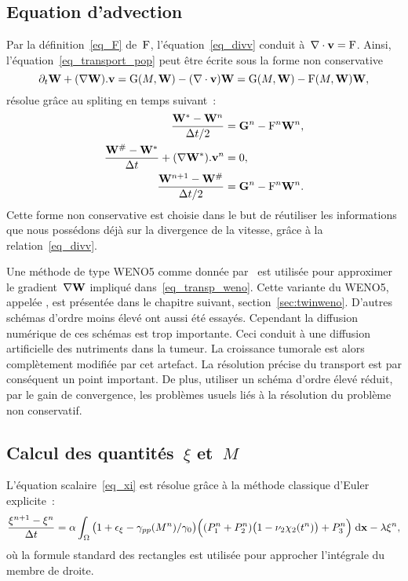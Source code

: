 \documentclass[main.tex]{subfiles}
\begin{document}
\subsection{Equation d'advection}
Par la définition~\eqref{eq_F} de~${\rm F}$, l'équation~\eqref{eq_divv} 
conduit à~$\nabla\cdot\mathbf{v}={\rm F}$. 
Ainsi, l'équation~\eqref{eq_transport_pop} peut être écrite sous la forme non conservative
\begin{equation}\label{eq_non_conservative}
\partial_t {\bf W} + (\nabla {\bf W}).\mathbf{v} = {\rm G}(M,{\bf W})-(\nabla\cdot \mathbf{v}){\bf W} = {\rm G}(M,{\bf W})-{\rm F}(M,{\bf W}){\bf W},
\end{equation}
résolue grâce au spliting en temps suivant~:
\begin{align}
 \dfrac{\W^*-\W^n}{\Delta t / 2}  &= \GG^n-\Frm^n\W^n, %
 \label{eq_snd_membre} \\
\dfrac{\W^\#-\W^*}{\Delta t} + (\nabla \W^*).\vit^n&= 0,%
 \label{eq_transp_weno}\\
 \dfrac{\W^{n+1}-\W^\#}{\Delta t / 2}  &= \GG^n-\Frm^n\W^n. \label{eq_snd_membre2} 
\end{align}
Cette forme non conservative est choisie dans le but de réutiliser les informations que nous possédons déjà sur la divergence de la vitesse, grâce à la relation~\eqref{eq_divv}.


Une méthode de type WENO5 comme donnée par~\cite{Liu1994} est utilisée pour approximer le gradient~$\nabla {\bf W}$ impliqué  dans~\eqref{eq_transp_weno}. Cette variante du WENO5, appelée \twinweno, est présentée dans le chapitre suivant, section~\ref{sec:twinweno}. 
D'autres schémas d'ordre moins élevé ont aussi été essayés. Cependant la diffusion numérique de ces schémas est trop importante. Ceci conduit à une diffusion artificielle des nutriments dans la tumeur. La croissance tumorale est alors complètement modifiée par cet artefact. La résolution précise du transport est par conséquent un point important. De plus,  utiliser un schéma d'ordre élevé réduit, par le gain de convergence, les problèmes usuels liés à la résolution du problème non conservatif.

\subsection{Calcul des quantités~$\xi$ et~$M$}
L'équation scalaire~\eqref{eq_xi} est résolue grâce à la méthode classique d'Euler explicite~:
\begin{equation}\label{eq:xi_disc}
\dfrac{\xi^{n+1}-\xi^n}{\Delta t} = \alpha \int_\Omega \big(1+\epsilon_{\xi} - \gamma_{pp}(M^n) / \gamma_0 \big)\Big((P_1^n +P_2^n) \big(1-\nu_2 \chi_2(t^n) \big)+P_3^n \Big) \textrm{\;d}\mathbf{x} - \lambda \xi^n,
\end{equation} 
où la formule standard des rectangles est utilisée pour approcher l'intégrale du membre de droite.
\end{document}
